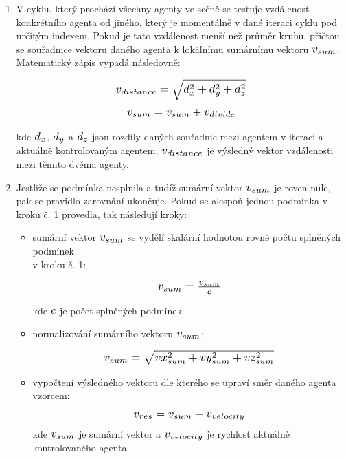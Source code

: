 \documentclass[czech,public,dept460,male,cpdeclaration]{diploma}
\begin{document}
\begin{enumerate}
	\item V cyklu, který prochází všechny agenty ve scéně se testuje vzdálenost konkrétního agenta od jiného, který je momentálně v dané iteraci cyklu pod určitým indexem. Pokud je tato vzdálenost menší než průměr kruhu, přičtou se souřadnice vektoru daného agenta k lokálnímu sumárnímu vektoru \( \scalebox{1.2}{$v_{sum}$} \). Matematický zápis vypadá následovně:
	
		\[ \scalebox{1.2}{$v_{distance} = \sqrt{d_x^2 + d_y^2 + d_z^2}$} \]
		\[ \scalebox{1.2}{$v_{sum} = v_{sum} + v_{divide}$} \]
		
		kde \( \scalebox{1.2}{$d_{x}$} \), \( \scalebox{1.2}{$d_{y}$} \) a \( \scalebox{1.2}{$d_{z}$} \) jsou rozdíly daných souřadnic mezi agentem v iteraci a aktuálně kontrolovaným agentem, \( \scalebox{1.2}{$v_{distance}$} \) je výsledný vektor vzdálenosti mezi těmito dvěma agenty.
		
	\item Jestliže se podmínka nesplnila a tudíž sumární vektor \( \scalebox{1.2}{$v_{sum}$} \) je roven nule, pak se pravidlo zarovnání ukončuje. Pokud se alespoň jednou podmínka v kroku č. 1 provedla, tak následují kroky:
	
	\begin{itemize}
		\item sumární vektor \( \scalebox{1.2}{$v_{sum}$} \) se vydělí skalární hodnotou rovné počtu splněných podmínek \\v kroku č. 1:
		
		\[ \scalebox{1.2}{$v_{sum} = \frac{v_{sum}}{c}$} \]
		
		kde \( \scalebox{1.2}{$c$} \) je počet splněných podmínek. 
		
		\item normalizování sumárního vektoru \( \scalebox{1.2}{$v_{sum}$} \):
		
		\[ \scalebox{1.2}{$v_{sum} = \sqrt{vx_{sum}^2 + vy_{sum}^2 + vz_{sum}^2}$} \]
		
		\item vypočtení výsledného vektoru dle kterého se upraví směr daného agenta vzorcem: 
		\[ \scalebox{1.2}{$v_{res} = v_{sum} - v_{velocity}$} \]
		kde \( \scalebox{1.2}{$v_{sum}$} \) je sumární vektor a \( \scalebox{1.2}{$v_{velocity}$} \) je rychlost aktuálně kontrolovaného agenta.
	\end{itemize}
	
\end{enumerate}
\end{document}
